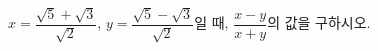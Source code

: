 $x=\dfrac{\sqrt{5}+\sqrt{3}}{\sqrt{2}}$, $y=\dfrac{\sqrt{5}-\sqrt{3}}{\sqrt{2}}$일 때, $\dfrac{x-y}{x+y}$의 값을 구하시오.
